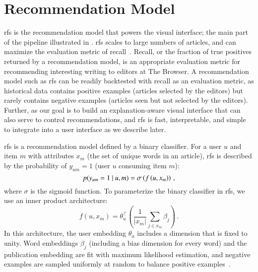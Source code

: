 \section{Recommendation Model}
\acrfull{rfs} is the recommendation model that powers the visual interface; the main part of the pipeline illustrated in . \gls{rfs} scales to large numbers of articles, and can maximize the evaluation metric of recall~\parencite{altosaar2020rankfromsets:,altosaar2020probabilistic}. Recall, or the fraction of true positives returned by a recommendation model, is an appropriate evaluation metric for recommending interesting writing to editors at The Browser. A recommendation model such as \gls{rfs} can be readily backtested with recall as an evaluation metric, as historical data contains positive examples (articles selected by the editors) but rarely contains negative examples (articles seen but not selected by the editors). Further, as our goal is to build an explanation-aware visual interface that can also serve to control recommendations, and \gls{rfs} is fast, interpretable, and simple to integrate into a user interface as we describe later.

\gls{rfs} is a recommendation model defined by a binary classifier. For a user $u$ and item $m$ with attributes $x_m$ (the set of unique words in an article), \gls{rfs} is described by the probability of $y_{um} = 1$ (user $u$ consuming item $m$):
$$p(y_{um} = 1 ~\vert~ u, m) = \sigma\left( f \left (u, x_m\right) \right)\, ,$$
where $\sigma$ is the sigmoid function. To parameterize the binary classifier in \gls{rfs}, we use an inner product architecture:
\begin{equation}
\label{eq:inner-product}
  f\left(u, x_m\right) = \theta_u^\top\left(\frac{1}{|x_m|}\sum_{j\in x_m}
  \beta_j\right)\, .
\end{equation}
In this architecture, the user embedding $\theta_u$ includes a dimension that is fixed to unity. Word embeddings $\beta_j$ (including a bias dimension for every word) and the publication embedding are fit with maximum likelihood estimation, and negative examples are sampled uniformly at random to balance positive examples~\parencite{altosaar2020probabilistic}.

